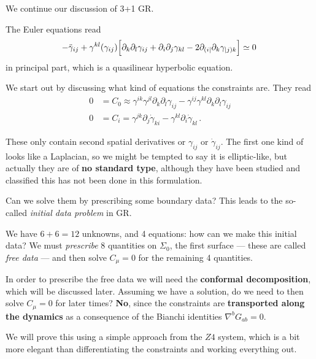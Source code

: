 \documentclass[main.tex]{subfiles}
\begin{document}

We continue our discussion of 3+1 GR. 

The Euler equations read 
%
\begin{align}
- \ddot{\gamma}_{ij} + \gamma^{kl} (\gamma_{ij}) \qty[
    \partial_{k} \partial_{l} \gamma_{ij}
    + \partial_{i} \partial_{j} \gamma_{kl}
    - 2 \partial_{(i|} \partial_{k} \gamma_{|j) k}
] \simeq 0
\,
\end{align}
%
in principal part, which is a quasilinear hyperbolic equation. 

We start out by discussing what kind of equations the constraints are. 
They read 
%
\begin{align}
0 &= C_0 \approx \gamma^{ik} \gamma^{jl} \partial_{k} \partial_{l} \gamma_{ij} - \gamma^{ij} \gamma^{kl} \partial_{k }\partial_{l} \gamma_{ij}  \\
0 &= C_i = \gamma^{jk} \partial_{j} \dot{\gamma}_{ki} - \gamma^{kl} \partial_{i} \dot{\gamma}_{kl}
\,.
\end{align}

These only contain second spatial derivatives or \(\gamma_{ij}\) or \(\dot{\gamma}_{ij}\). 
The first one kind of looks like a Laplacian, so we might be tempted to say it is elliptic-like, but actually they are of \textbf{no standard type}, although they have been studied and classified this has not been done in this formulation. 

Can we solve them by prescribing some boundary data? This leads to the so-called \emph{initial data problem} in GR. 

We have \(6+6=12\) unknowns, and 4 equations: how can we make this initial data? We must \emph{prescribe} 8 quantities on \(\Sigma_0\), the first surface --- these are called \emph{free data} --- and then solve \(C_\mu = 0\) for the remaining 4 quantities. 

In order to prescribe the free data we will need the \textbf{conformal decomposition}, which will be discussed later. 
Assuming we have a solution, do we need to then solve \(C_\mu = 0\) for later times? \textbf{No}, since the constraints are \textbf{transported along the dynamics} as a consequence of the Bianchi identities \(\nabla^{b} G_{ab}= 0\). 

We will prove this using a simple approach from the \(Z4\) system, which is a bit more elegant than differentiating the constraints and working everything out. 
\end{document}

